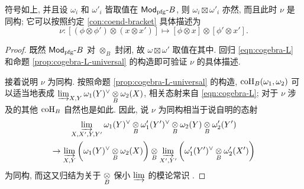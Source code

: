 \begin{lemma}
	符号如上, 并且设 $\omega_i$ 和 $\omega'_i$ 皆取值在 $\mathsf{Mod}_{\mathrm{pfg}}\text{-}B$, 则 $\omega_i \boxtimes \omega'_i$ 亦然, 而且此时 $\nu$ 是同构; 它可以按照约定 \ref{con:coend-bracket} 具体描述为
	\begin{equation*}
		\nu: \left[ (\phi \otimes \phi') \otimes (x \otimes x') \right] \mapsto [\phi \otimes x] \otimes [\phi' \otimes x'].
	\end{equation*}
\end{lemma}
\begin{proof}
	既然 $\mathsf{Mod}_{\mathrm{pfg}}\text{-}B$ 对 $\otimes_B$ 封闭, 故 $\omega \boxtimes \omega'$ 取值在其中. 回归 \eqref{eqn:cogebra-L} 和命题 \ref{prop:cogebra-L-universal} 的构造即可验证 $\nu$ 的具体描述.
	
	接着说明 $\nu$ 为同构. 按照命题 \ref{prop:cogebra-L-universal} 的构造, $\operatorname{coH}_B(\omega_1, \omega_2)$ 可以适当地表成 $\varinjlim_{X, Y} \omega_1(Y)^\vee \underset{B}{\otimes} \omega_2(X)$, 相关态射来自 \eqref{eqn:cogebra-L}; 对于 $\nu$ 涉及的其他 $\operatorname{coH}_B$ 自然也是如此. 因此, 说 $\nu$ 为同构相当于说自明的态射
	\begin{multline*}
		\varinjlim_{X, X', Y, Y'} \omega_1(Y)^\vee \underset{B}{\otimes} \omega'_1(Y')^\vee \underset{B}{\otimes} \omega_2(Y) \underset{B}{\otimes} \omega'_2(Y') \\
		\to \varinjlim_{X, Y} \left( \omega_1(Y)^\vee \underset{B}{\otimes} \omega_2(X) \right) \underset{B}{\otimes} \varinjlim_{X', Y'} \left( \omega'_1(Y')^\vee \underset{B}{\otimes} \omega'_2(X') \right)
	\end{multline*}
	为同构, 而这又归结为关于 $\underset{B}{\otimes}$ 保小 $\varinjlim$ 的模论常识 \cite[命题 6.9.2]{Li1}.
\end{proof}

